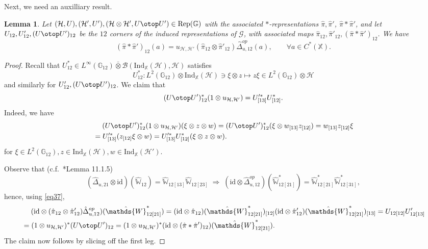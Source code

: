 \documentclass[reqno]{amsart}
\numberwithin{equation}{section}
\newtheorem{Lem}[Theorem]{Lemma}
\newcommand{\mcB}{\mathcal{B}}
\newcommand{\id}{\mathrm{id}}
\newcommand{\G}{\mathbb{G}}
\newcommand{\X}{\mathbb{X}}
\newcommand{\msG}{\mathscr{G}}
\newcommand{\Rep}{\mathrm{Rep}}
\newcommand{\Ind}{\mathrm{Ind}}
\newcommand{\mc}{\mathcal}
\newcommand{\GG}{\mathbb{G}}
\newcommand{\Ww}{\mathds{W}}
\begin{document}
Next, we need an auxilliary result.

\begin{Lem}\label{lemma11}
Let $(\mc{H},U),(\mc{H}',U'),(\mc{H}\otimes\mc{H}',U\otop U')\in \Rep(\GG)$ with the associated $*$-representations $\hat{\pi},\hat{\pi}'$, $\hat{\pi}\ast \hat{\pi}'$, and let $U_{12}, U'_{12}, (U\otop U')_{12}$ be the $12$ corners of the induced representations of $\msG$, with associated maps $\hat{\pi}_{12},\hat{\pi}'_{12},(\hat{\pi}\ast\hat{\pi}')_{12}$. We have
\[
(\hat{\pi}\ast \hat{\pi}')_{12}(a)=
u_{\mc{H},\mc{H}'}(\hat{\pi}_{12}\otimes \hat{\pi}'_{12})\hat{\Delta}_{u,12}^{op}(a),\qquad \forall a\in C^*(\X).
\]
\end{Lem}

\begin{proof}
Recall that $U_{12}^*\in L^{\infty}(\GG_{12})\bar\otimes \mcB( \Ind_{\X}(\mc{H}),\mc{H})$ satisfies
\[
U_{12}^*\colon L^2(\GG_{12})\otimes \Ind_{\X}(\mc{H})\ni \xi\otimes z\mapsto z\xi \in L^2(\G_{12})\otimes \mc{H}
\]
and similarly for $U'_{12},(U\otop U')_{12}$. We claim that
\begin{equation}\label{eq37}
(U\otop U')_{12}^* (1\otimes u_{\mc{H},\mc{H}'})= 
U'^*_{[13]} U^*_{[12]}.
\end{equation}
Indeed, we have
\[\begin{split}
&\quad\;
(U\otop U')_{12}^* (1\otimes u_{\mc{H},\mc{H}'})(\xi\otimes z \otimes w)=
(U\otop U')_{12}^* (\xi\otimes w_{[13]} z_{[12]})=
w_{[13]}z_{[12]}\xi\\
&=
U'^*_{[13]}( z_{[12]}\xi\otimes w)=
U'^*_{[13]}U^*_{[12]} (\xi\otimes z\otimes w). 
\end{split}\]
for $\xi\in L^2(\G_{12}),z\in \Ind_{\X}(\mc{H}),w\in \Ind_{\X}(\mc{H}')$. 

Observe that (c.f.~\cite{DC09}*{Lemma 11.1.5})
\[
(\hat{\Delta}_{u,21}\otimes \id)(\hat{\Ww}_{12})=
\hat{\Ww}_{12[13]} \hat{\Ww}_{12[23]}\;\Rightarrow\;
(\id\otimes \hat{\Delta}_{u,12}^{op})(\hat{\Ww}_{12 [21]}^*) = \hat{\Ww}_{12[21]}^*\hat{\Ww}_{12 [31]}^*,
\]
hence, using \eqref{eq37},
\[\begin{split}
&\quad\;
(\id\otimes (\hat{\pi}_{12}\otimes \hat{\pi}'_{12})\hat{\Delta}_{u,12}^{op})(\hat{\Ww}_{12[21]}^*)=
(\id\otimes \hat{\pi}_{12} )(\hat{\Ww}_{12 [21]}^*)_{[12]}
(\id\otimes \hat{\pi}'_{12})(\hat{\Ww}_{12 [21]}^*)_{[13]}=
 U_{12[12]}U'_{12[13]}\\
 &=
(1\otimes u_{\mc{H},\mc{H}'})^*
(U\otop U')_{12}=
 (1\otimes u_{\mc{H},\mc{H}'})^*
(\id\otimes (\hat{\pi}\ast\hat{\pi}')_{12} )(\hat{\Ww}_{12 [21]}^*).
\end{split}\]
The claim now follows by slicing off the first leg.
\end{proof}
\end{document}
